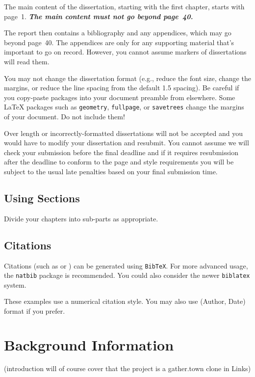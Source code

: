 \documentclass[bsc,frontabs,singlespacing,parskip,deptreport]{infthesis}
\begin{document}
The main content of the dissertation, starting with the first chapter,
starts with page~1. \emph{\textbf{The main content must not go beyond page~40.}}

The report then contains a bibliography and any appendices, which may go beyond
page~40. The appendices are only for any supporting material that's important to
go on record. However, you cannot assume markers of dissertations will read them.

You may not change the dissertation format (e.g., reduce the font size, change
the margins, or reduce the line spacing from the default 1.5 spacing). Be
careful if you copy-paste packages into your document preamble from elsewhere.
Some \LaTeX{} packages such as \texttt{geometry}, \texttt{fullpage}, or
\texttt{savetrees} change the margins of your document. Do not include them!

Over length or incorrectly-formatted dissertations will not be accepted and you
would have to modify your dissertation and resubmit. You cannot assume we will
check your submission before the final deadline and if it requires resubmission
after the deadline to conform to the page and style requirements you will be
subject to the usual late penalties based on your final submission time.

\section{Using Sections}

Divide your chapters into sub-parts as appropriate.

\section{Citations}

Citations (such as \cite{P1} or \cite{P2}) can be generated using
\texttt{BibTeX}. For more advanced usage, the \texttt{natbib} package is
recommended. You could also consider the newer \texttt{biblatex} system.

These examples use a numerical citation style. You may also use
(Author, Date) format if you prefer.

\chapter{Background Information}

(introduction will of course cover that the project is a gather.town clone in Links)
\end{document}
